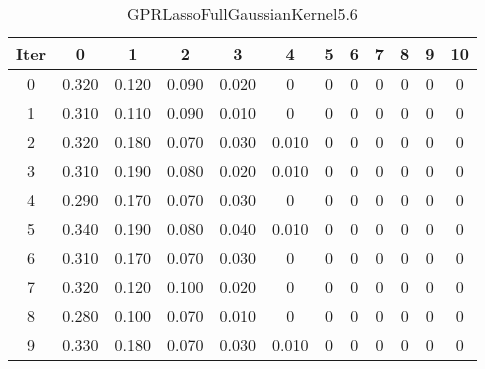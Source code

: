 \begin{table}
	\begin{center}
		\begin{tabular}{|c|c|c|c|c|c|c|c|c|c|c|c|}
			\hline
			Iter & 0 & 1 & 2 & 3 & 4 & 5 & 6 & 7 & 8 & 9 & 10 \\
			\hline
			0 & 0.320 & 0.120 & 0.090 & 0.020 & 0 & 0 & 0 & 0 & 0 & 0 & 0 \\
			\hline
			1 & 0.310 & 0.110 & 0.090 & 0.010 & 0 & 0 & 0 & 0 & 0 & 0 & 0 \\
			\hline
			2 & 0.320 & 0.180 & 0.070 & 0.030 & 0.010 & 0 & 0 & 0 & 0 & 0 & 0 \\
			\hline
			3 & 0.310 & 0.190 & 0.080 & 0.020 & 0.010 & 0 & 0 & 0 & 0 & 0 & 0 \\
			\hline
			4 & 0.290 & 0.170 & 0.070 & 0.030 & 0 & 0 & 0 & 0 & 0 & 0 & 0 \\
			\hline
			5 & 0.340 & 0.190 & 0.080 & 0.040 & 0.010 & 0 & 0 & 0 & 0 & 0 & 0 \\
			\hline
			6 & 0.310 & 0.170 & 0.070 & 0.030 & 0 & 0 & 0 & 0 & 0 & 0 & 0 \\
			\hline
			7 & 0.320 & 0.120 & 0.100 & 0.020 & 0 & 0 & 0 & 0 & 0 & 0 & 0 \\
			\hline
			8 & 0.280 & 0.100 & 0.070 & 0.010 & 0 & 0 & 0 & 0 & 0 & 0 & 0 \\
			\hline
			9 & 0.330 & 0.180 & 0.070 & 0.030 & 0.010 & 0 & 0 & 0 & 0 & 0 & 0 \\
			\hline
		\end{tabular}
	\end{center}
	\caption{GPRLassoFullGaussianKernel5.6}
\end{table}